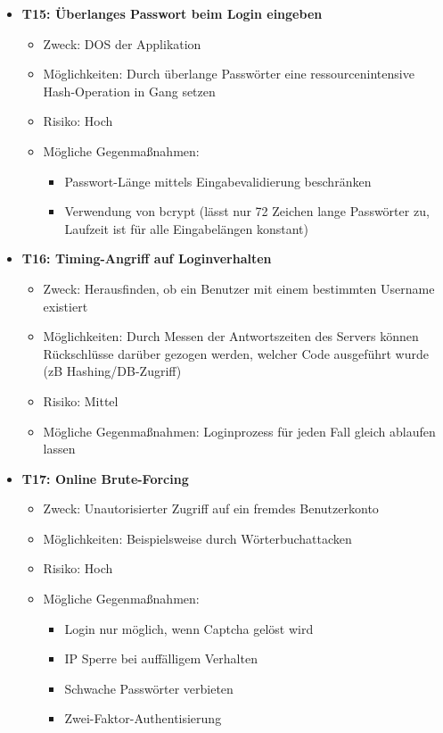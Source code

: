 \documentclass[12pt,DIV14,BCOR10mm,a4paper,parskip=half-,headsepline,headinclude,english,ngerman,bibliography=totocnumbered]{scrreprt}
\begin{document}
\begin{itemize}

  \hypertarget{threat15}{}
  \item \textbf{T15: Überlanges Passwort beim Login eingeben}
  \begin{itemize}
  \item Zweck: DOS der Applikation
  \item Möglichkeiten: Durch überlange Passwörter eine ressourcenintensive Hash-Operation in Gang setzen
  \item Risiko: Hoch
  \item Mögliche Gegenmaßnahmen:
  \begin{itemize}
  \item Passwort-Länge mittels Eingabevalidierung beschränken
  \item Verwendung von bcrypt (lässt nur 72 Zeichen lange Passwörter zu, Laufzeit ist für alle Eingabelängen konstant)
  \end{itemize}
\end{itemize}

  \hypertarget{threat16}{}
  \item \textbf{T16: Timing-Angriff auf Loginverhalten}
  \begin{itemize}
  \item Zweck: Herausfinden, ob ein Benutzer mit einem bestimmten Username existiert
  \item Möglichkeiten: Durch Messen der Antwortszeiten des Servers können Rückschlüsse darüber gezogen werden, welcher Code ausgeführt wurde (zB Hashing/DB-Zugriff)
  \item Risiko: Mittel
  \item Mögliche Gegenmaßnahmen: Loginprozess für jeden Fall gleich ablaufen lassen
  \end{itemize}

  \hypertarget{threat17}{}
  \item \textbf{T17: Online Brute-Forcing}
  \begin{itemize}
  \item Zweck: Unautorisierter Zugriff auf ein fremdes Benutzerkonto
  \item Möglichkeiten: Beispielsweise durch Wörterbuchattacken
  \item Risiko: Hoch
  \item Mögliche Gegenmaßnahmen:
  \begin{itemize}
      \item Login nur möglich, wenn Captcha gelöst wird
      \item IP Sperre bei auffälligem Verhalten
      \item Schwache Passwörter verbieten
      \item Zwei-Faktor-Authentisierung %
    \end{itemize}
  \end{itemize}
\end{itemize}
\end{document}
